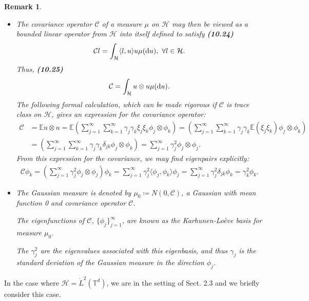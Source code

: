 \documentclass[oneside,11pt]{book}
\numberwithin{equation}{section}
\newtheorem{remark}{Remark}[section]
\begin{document}
\begin{remark}
\begin{itemize}
        The expression (10.19) is known as the \emph{Karhunen-Loève expansion} and the eigenfunctions $\{\phi_j\}_{j=1}^\infty$ as the \emph{Karhunen-Loève basis}.
        \item The covariance operator $\mathcal{C}$ of a measure $\mu$ on $\mathcal{H}$ may then be viewed as a bounded linear operator from $\mathcal{H}$ into itself defined to satisfy \textbf{(10.24)}
        \begin{align*}
            \mathcal{C}l = \int_{\mathcal{H}} \langle l,u\rangle u\mu({\rm d}u),\ \forall l\in\mathcal{H}.
        \end{align*}
        Thus, \textbf{(10.25)}
        \begin{align*}
            \mathcal{C} = \int_{\mathcal{H}} u\otimes u\mu({\rm d}u).
        \end{align*}
        The following formal calculation, which can be made rigorous if $\mathcal{C}$ is trace class on $\mathcal{H}$, gives an expression for the covariance operator:
        \begin{align*}
            \mathcal{C} &= \mathbb{E}u\otimes u = \mathbb{E}\left(\sum_{j=1}^\infty\sum_{k=1}^\infty \gamma_j\gamma_k\xi_j\xi_k\phi_j\otimes\phi_k\right) = \left(\sum_{j=1}^\infty\sum_{k=1}^\infty \gamma_j\gamma_k\mathbb{E}(\xi_j\xi_k)\phi_j\otimes\phi_k\right)\\
            &= \left(\sum_{j=1}^\infty\sum_{k=1}^\infty \gamma_j\gamma_k\delta_{jk}\phi_j\otimes\phi_k\right) = \sum_{j=1}^\infty \gamma_j^2\phi_j\otimes\phi_j.
        \end{align*}
        From this expression for the covariance, we may find eigenpairs explicitly:
        \begin{align*}
            \mathcal{C}\phi_k = \left(\sum_{j=1}^\infty \gamma_j^2\phi_j\otimes\phi_j\right)\phi_k = \sum_{j=1}^\infty \gamma_j^2\langle\phi_j,\phi_k\rangle\phi_j = \sum_{j=1}^\infty \gamma_j^2\delta_{jk}\phi_k = \gamma_k^2\phi_k.
        \end{align*}
        \item The Gaussian measure is denoted by $\mu_0\coloneqq N(0,\mathcal{C})$, a Gaussian with mean function 0 and covariance operator $\mathcal{C}$.
        
        The eigenfunctions of $\mathcal{C}$, $\{\phi_j\}_{j=1}^\infty$, are known as the \emph{Karhunen-Loève basis} for measure $\mu_0$.
        
        The $\gamma_j^2$ are the eigenvalues associated with this eigenbasis, and thus $\gamma_j$ is the standard deviation of the Gaussian measure in the direction $\phi_j$.
    \end{itemize}
\end{remark}
In the case where $\mathcal{H} = \dot{L}^2(\mathbb{T}^d)$, we are in the setting of Sect. 2.3 and we briefly consider this case.
\end{document}
